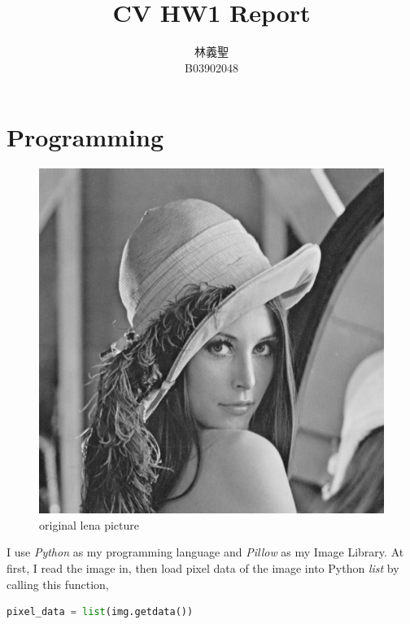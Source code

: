 \documentclass[12pt,twoside,a4paper]{article}
\title{CV HW1 Report}
\author{林義聖\\B03902048}
\date{}
\begin{document}
\maketitle

\section{Programming}

\begin{figure}[H]
\centering
\includegraphics[scale=0.4]{lena.bmp}
\caption{original lena picture}
\label{fig:lena.bmp}
\end{figure}

I use \textit{Python} as my programming language and \textit{Pillow} as my Image Library. At first, I read the image in, then load pixel data of the image into Python \textit{list} by calling this function,
\begin{lstlisting}[language=Python]
pixel_data = list(img.getdata())
\end{lstlisting}
\end{document}
